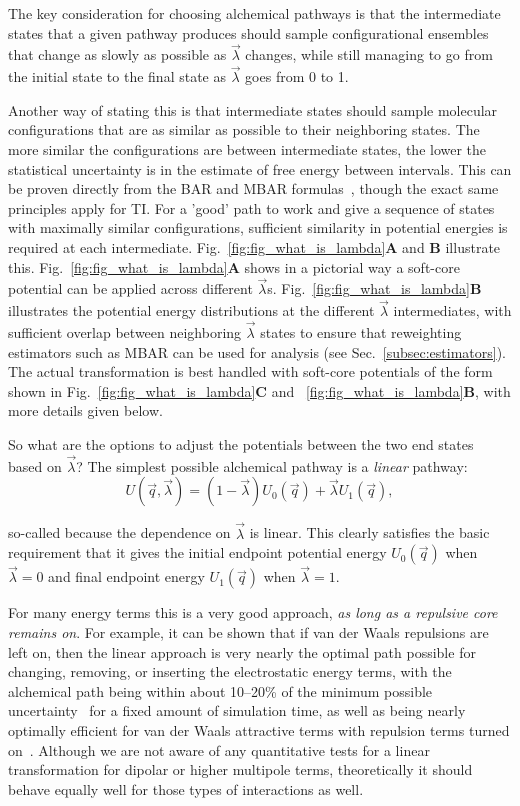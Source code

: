 \documentclass[9pt,bestpractices]{livecoms}
\begin{document}
The key consideration for choosing alchemical pathways is that the intermediate states that a given pathway produces should sample configurational ensembles that change as slowly as possible as $\vec{\lambda}$ changes, while still managing to go from the initial state to the final state as $\vec{\lambda}$ goes from 0 to 1.

Another way of stating this is that intermediate states should sample molecular configurations that are as similar as possible to their neighboring states. The more similar the configurations are between intermediate states, the lower the statistical uncertainty is in the estimate of free energy between intervals. This can be proven directly from the BAR and MBAR formulas~\cite{bennett1976efficient,klimovich2015guidelines}, though the exact same principles apply for TI. For a 'good' path to work and give a sequence of states with maximally similar configurations, sufficient similarity in potential energies is required at each intermediate. Fig.~\ref{fig:fig_what_is_lambda}\textbf{A} and \textbf{B} illustrate this. Fig.~\ref{fig:fig_what_is_lambda}\textbf{A} shows in a pictorial way a soft-core potential can be applied across different $\vec{\lambda}$s. Fig.~\ref{fig:fig_what_is_lambda}\textbf{B} illustrates the potential energy distributions at the different $\vec{\lambda}$ intermediates, with sufficient overlap between neighboring $\vec{\lambda}$ states to ensure that reweighting estimators such as MBAR can be used for analysis (see Sec.~\ref{subsec:estimators}). The actual transformation is best handled with soft-core potentials of the form shown in Fig.~\ref{fig:fig_what_is_lambda}\textbf{C} and ~\ref{fig:fig_what_is_lambda}\textbf{B}, with more details given below. 

So what are the options to adjust the potentials between the two end states based on $\vec{\lambda}$? The simplest possible alchemical pathway is a \textit{linear} pathway:
\begin{equation}
U(\vec{q},\vec{\lambda}) = (1-\vec{\lambda}) U_0(\vec{q}) + \vec{\lambda}U_1(\vec{q}), \end{equation}

so-called because the dependence on $\vec{\lambda}$ is linear. This clearly satisfies the basic requirement that it gives the initial endpoint potential energy $U_0(\vec{q})$ when $\vec{\lambda}=0$ and final endpoint energy $U_1(\vec{q})$ when $\vec{\lambda}=1$. 

For many energy terms this is a very good approach, \textit{as long as a repulsive core remains on}. For example, it can be shown that if van der Waals repulsions are left on, then the linear approach is very nearly the optimal path possible for changing, removing, or inserting the electrostatic energy terms, with the alchemical path being within about 10--20\% of the minimum possible uncertainty~\cite{naden2015linear} for a fixed amount of simulation time, as well as being nearly optimally efficient for van der Waals attractive terms with repulsion terms turned on~\cite{naden2014linear}. Although we are not aware of any quantitative tests for a linear transformation for dipolar or higher multipole terms, theoretically it should behave equally well for those types of interactions as well.
\end{document}
